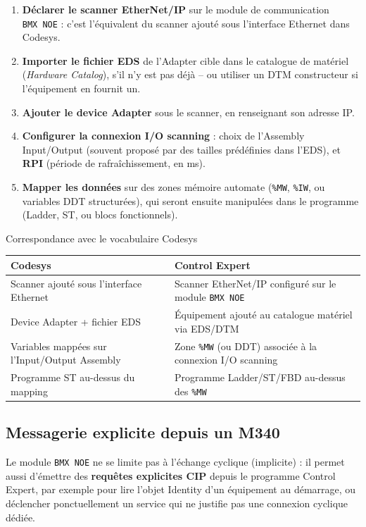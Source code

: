 \begin{enumerate}
    \item \textbf{Déclarer le scanner EtherNet/IP} sur le module de communication \texttt{BMX~NOE} : c'est l'équivalent du scanner ajouté sous l'interface Ethernet dans Codesys.
    \item \textbf{Importer le fichier EDS} de l'Adapter cible dans le catalogue de matériel (\emph{Hardware Catalog}), s'il n'y est pas déjà -- ou utiliser un DTM constructeur si l'équipement en fournit un.
    \item \textbf{Ajouter le device Adapter} sous le scanner, en renseignant son adresse IP.
    \item \textbf{Configurer la connexion I/O scanning} : choix de l'Assembly Input/Output (souvent proposé par des tailles prédéfinies dans l'EDS), et \textbf{RPI} (période de rafraîchissement, en ms).
    \item \textbf{Mapper les données} sur des zones mémoire automate (\texttt{\%MW}, \texttt{\%IW}, ou variables DDT structurées), qui seront ensuite manipulées dans le programme (Ladder, ST, ou blocs fonctionnels).
\end{enumerate}

\begin{UPSTIidee}{Correspondance avec le vocabulaire Codesys}
    \begin{center}
        \begin{tabular}{|p{5.5cm}|p{7.5cm}|}
            \hline
            \textbf{Codesys} & \textbf{Control Expert} \\
            \hline
            Scanner ajouté sous l'interface Ethernet & Scanner EtherNet/IP configuré sur le module \texttt{BMX~NOE} \\
            \hline
            Device Adapter + fichier EDS & Équipement ajouté au catalogue matériel via EDS/DTM \\
            \hline
            Variables mappées sur l'Input/Output Assembly & Zone \texttt{\%MW} (ou DDT) associée à la connexion I/O scanning \\
            \hline
            Programme ST au-dessus du mapping & Programme Ladder/ST/FBD au-dessus des \texttt{\%MW} \\
            \hline
        \end{tabular}
    \end{center}
\end{UPSTIidee}

\subsection{Messagerie explicite depuis un M340}
Le module \texttt{BMX~NOE} ne se limite pas à l'échange cyclique (implicite) : il permet aussi d'émettre des \textbf{requêtes explicites CIP} depuis le programme Control Expert, par exemple pour lire l'objet Identity d'un équipement au démarrage, ou déclencher ponctuellement un service qui ne justifie pas une connexion cyclique dédiée.

